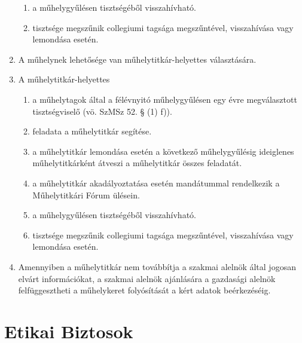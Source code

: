 \documentclass{../styles/rulebook}
\begin{document}
\begin{enumerate}
\begin{enumerate}
        \item a műhelygyűlésen tisztségéből visszahívható.
        \item tisztsége megszűnik collegiumi tagsága megszűntével, visszahívása vagy lemondása esetén.
	\end{enumerate}
    \item A műhelynek lehetősége van műhelytitkár-helyettes választására.
    \item A műhelytitkár-helyettes
	\begin{enumerate}
        \item a műhelytagok által a félévnyitó műhelygyűlésen egy évre megválasztott tisztségviselő (vö. SzMSz 52. § (1) f)).
        \item feladata a műhelytitkár segítése.
        \item a műhelytitkár lemondása esetén a következő műhelygyűlésig ideiglenes műhelytitkárként átveszi a műhelytitkár összes feladatát.
        \item a műhelytitkár akadályoztatása esetén mandátummal rendelkezik a Műhelytitkári Fórum ülésein.
        \item a műhelygyűlésen tisztségéből visszahívható.
        \item tisztsége megszűnik collegiumi tagsága megszűntével, visszahívása vagy lemondása esetén.
	\end{enumerate}
    \item Amennyiben a műhelytitkár nem továbbítja a szakmai alelnök által jogosan elvárt információkat, a szakmai alelnök ajánlására a gazdasági alelnök felfüggesztheti a műhelykeret folyósítását a kért adatok beérkezéséig.
\end{enumerate}

\section{Etikai Biztosok}
\end{document}

